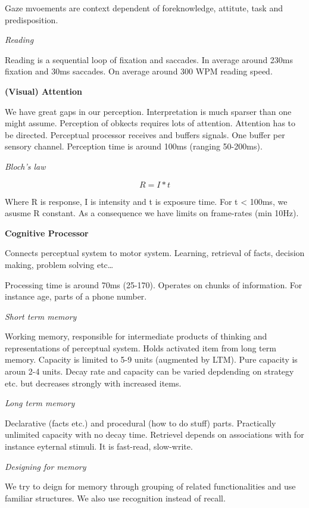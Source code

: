 Gaze mvoements are context dependent of foreknowledge, attitute, task and predisposition. \medskip

\textit{Reading} \smallskip

Reading is a sequential loop of fixation and saccades. In average around 230ms fixation and 30ms saccades. On average around 300 WPM reading speed. \medskip

\textbf{(Visual) Attention} \smallskip

We have great gaps in our perception. Interpretation is much sparser than one might assume. Perception of obkects requires lots of attention. Attention has to be directed. \medskip
Perceptual processor receives and buffers signals. One buffer per sensory channel. Perception time is around 100ms (ranging 50-200ms). \medskip

\textit{Bloch's law} \smallskip

$$R = I * t$$

Where R is response, I is intensity and t is exposure time. For t < 100ms, we asusme R constant. As a consequence we have limits on frame-rates (min 10Hz). \medskip

\textbf{Cognitive Processor} \smallskip

Connects perceptual system to motor system. Learning, retrieval of facts, decision making, problem solving etc\dots \medskip

Processing time is around 70ms (25-170). Operates on chunks of information. For instance age, parts of a phone number. \medskip

\textit{Short term memory} \smallskip

Working memory, responsible for intermediate products of thinking and representations of perceptual system. Holds activated item from long term memory. Capacity is limited to 5-9 units (augmented by LTM). Pure capacity is aroun 2-4 units. Decay rate and capacity can be varied depdending on strategy etc. but decreases strongly with increased items. \medskip

\textit{Long term memory} \smallskip

Declarative (facts etc.) and procedural (how to do stuff) parts. Practically unlimited capacity with no decay time. Retrievel depends on associations with for instance eyternal stimuli. It is fast-read, slow-write. 

\textit{Designing for memory} \smallskip

We try to deign for memory through grouping of related functionalities and use familiar structures. We also use recognition instead of recall. \medskip

